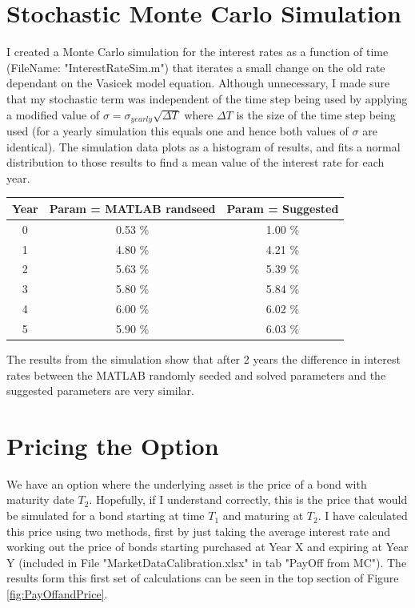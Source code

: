 \documentclass[10pt,a4paper]{article}
\theoremstyle{definition}
\theoremstyle{plain}
\theoremstyle{definition}
\theoremstyle{plain}
\begin{document}
\section{Stochastic Monte Carlo Simulation}
I created a Monte Carlo simulation for the interest rates as a function of time (FileName: "InterestRateSim.m") that iterates a small change on the old rate dependant on the Vasicek model equation. Although unnecessary, I made sure that my stochastic term was independent of the time step being used by applying a modified value of $\sigma=\sigma_{yearly}\sqrt{\Delta T}$ where $\Delta T$ is the size of the time step being used (for a yearly simulation this equals one and hence both values of $\sigma$ are identical). The simulation data plots as a histogram of results, and fits a normal distribution to those results to find a mean value of the interest rate for each year.

\begin{center}
\begin{tabular}{c|c|c}
Year & Param = MATLAB randseed & Param = Suggested \\ \hline
0 & 0.53 \% & 1.00 \% \\
1 & 4.80 \% & 4.21 \% \\
2 & 5.63 \% & 5.39 \% \\
3 & 5.80 \% & 5.84 \% \\
4 & 6.00 \% & 6.02 \% \\
5 & 5.90 \% & 6.03 \% \\
\end{tabular}
\end{center}

The results from the simulation show that after 2 years the difference in interest rates between the MATLAB randomly seeded and solved parameters and the suggested parameters are very similar.

\section{Pricing the Option}

We have an option where the underlying asset is the price of a bond with maturity date $T_{2}$. Hopefully, if I understand correctly, this is the price that would be simulated for a bond starting at time $T_{1}$ and maturing at $T_{2}$. I have calculated this price using two methods, first by just taking the average interest rate and working out the price of bonds starting purchased at Year X and expiring at Year Y (included in File "MarketDataCalibration.xlsx" in tab "PayOff from MC"). The results form this first set of calculations can be seen in the top section of Figure \ref{fig:PayOffandPrice}.
\end{document}
